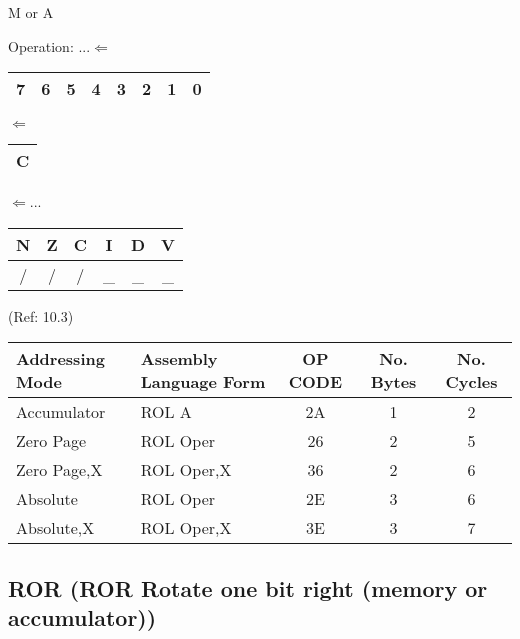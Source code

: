 \documentclass{article}
\begin{document}
  \begin{center}M or A\end{center}
  Operation:
  ...$\Leftarrow$
  \begin{tabular}{|c|c|c|c|c|c|c|c|}
  \hline
  7 & 6 & 5 & 4 & 3 & 2 & 1 & 0 \\
  \hline
  \end{tabular}
  $\Leftarrow$
  \begin{tabular}{|c|}
  \hline
  C \\
  \hline
  \end{tabular}
  $\Leftarrow$...

  \begin{table}[H]
  \centering
  \begin{tabular}{|c c c c c c|}
  \hline
  N&Z&C&I&D&V\\
  \hline
  / & / & / & \_ & \_ & \_\\
  \hline
  \end{tabular}
  \end{table}
                                 (Ref: 10.3)
  \begin{table}[H]
  \centering
  \begin{tabular}{|l|l|c|c|c|}
  \hline
    Addressing Mode& Assembly Language Form& OP CODE &No. Bytes&No. Cycles\\
  \hline
     Accumulator   &   ROL A               &    2A   &    1    &    2     \\
     Zero Page     &   ROL Oper            &    26   &    2    &    5     \\
     Zero Page,X   &   ROL Oper,X          &    36   &    2    &    6     \\
     Absolute      &   ROL Oper            &    2E   &    3    &    6     \\
     Absolute,X    &   ROL Oper,X          &    3E   &    3    &    7     \\
  \hline
  \end{tabular}
  \end{table}


  \subsection{ROR (ROR Rotate one bit right (memory or accumulator))}
\end{document}
